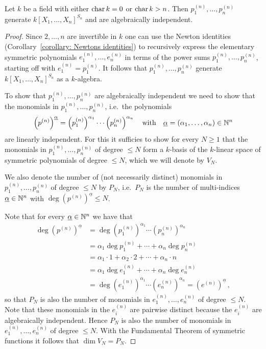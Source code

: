 \begin{theorem}
  Let $k$ be a field with either $\operatorname{char} k = 0$ or $\operatorname{char} k > n$.
  Then $p^{(n)}_1, \dotsc, p^{(n)}_n$ generate $k[X_1, \dotsc, X_n]^{S_n}$ and are algebraically independent.
\end{theorem}
\begin{proof}
  Since $2, \dotsc, n$ are invertible in $k$ one can use the Newton identities (Corollary~\ref{corollary: Newtons identities}) to recursively express the elementary symmetric polynomials $e^{(n)}_1, \dotsc, e^{(n)}_n$ in terms of the power sums $p^{(n)}_1, \dotsc, p^{(n)}_n$, starting off with $e^{(n)}_1 = p^{(n)}_1$.
  It follows that $p^{(n)}_1, \dotsc, p^{(n)}_n$ generate $k[X_1, \dotsc, X_n]^{S_n}$ as a $k$-algebra.
  
  To show that $p^{(n)}_1, \dotsc, p^{(n)}_n$ are algebraically independent we need to show that the monomials in $p^{(n)}_1, \dotsc, p^{(n)}_n$, i.e.\ the polynomials
  \[
      \left(p^{(n)}\right)^{\underline{\alpha}}
    = \left(p^{(n)}_1\right)^{\alpha_1} \dotsm \left(p^{(n)}_n\right)^{\alpha_n}
    \quad\text{with}\quad
        \underline{\alpha}
    =   (\alpha_1, \dotsc, \alpha_n)
    \in \mathbb{N}^n
  \]
  are linearly independent.
  For this it sufficies to show for every $N \geq 1$ that the monomials in $p^{(n)}_1, \dotsc, p^{(n)}_n$ of degree $\leq N$ form a $k$-basis of the $k$-linear space of symmetric polynomials of degree $\leq N$, which we will denote by $V_N$.
  
  We also denote the number of (not necessarily distinct) monomials in $p^{(n)}_1, \dotsc, p^{(n)}_n$ of degree $\leq N$ by $P_N$, i.e.\ $P_N$ is the number of multi-indices $\underline{\alpha} \in \mathbb{N}^n$ with $\deg (p^{(n)})^{\underline{\alpha}} \leq N$.
  
  Note that for every $\underline{\alpha} \in \mathbb{N}^n$ we have that
  \begin{align*}
        \deg \left( p^{(n)} \right)^{\underline{\alpha}}
    &=  \deg
        \left( p^{(n)}_1 \right)^{\alpha_1}
        \dotsm 
        \left( p^{(n)}_n \right)^{\alpha_n} \\
    &=    \alpha_1 \deg p^{(n)}_1
        + \dotsb 
        + \alpha_n \deg p^{(n)}_n \\
    &=    \alpha_1 \cdot 1
        + \alpha_2 \cdot 2
        + \dotsb
        + \alpha_n \cdot n  \\
    &=    \alpha_1 \deg e^{(n)}_1
        + \dotsb 
        + \alpha_n \deg e^{(n)}_n \\
    &=  \deg
        \left( e^{(n)}_1 \right)^{\alpha_1}
        \dotsm 
        \left( e^{(n)}_n \right)^{\alpha_n}
     =  \left( e^{(n)} \right)^{\underline{\alpha}} \,,
  \end{align*}
  so that $P_N$ is also the number of monomials in $e^{(n)}_1, \dotsc, e^{(n)}_n$ of degree $\leq N$.
  Note that these monomials in the $e^{(n)}_i$ are pairwise distinct because the $e^{(n)}_i$ are algebraically independent.
  Hence $P_N$ is also the number of monomials in $e^{(n)}_1, \dotsc, e^{(n)}_n$ of degree $\leq N$.
  With the Fundamental Theorem of symmetric functions it follows that $\dim V_N = P_N$.
  

\end{proof}
